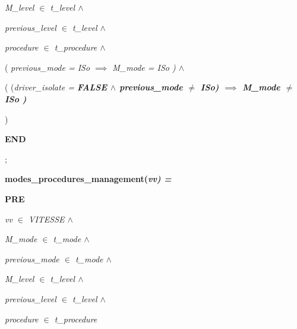 \documentclass[11pt]{article}
\begin{document}
\begin{sloppypar}
\hspace*{0.60in}\it M\_level  $\in$  \it t\_level  $\land$ 

\hspace*{0.60in}\it previous\_level  $\in$  \it t\_level  $\land$ 

\hspace*{0.60in}\it procedure  $\in$  \it t\_procedure  $\land$ 

\hspace*{0.60in}\rm ( \it previous\_mode \rm = \it ISo  $\implies$  \it M\_mode \rm = \it ISo \rm )\hspace*{0.15in} $\land$ 

\hspace*{0.60in}\hspace*{0.60in}\hspace*{0.60in}\rm ( \rm (\it driver\_isolate \rm = \bf FALSE  $\land$  \it previous\_mode  $\not =$  \it ISo\rm )  $\implies$ \hspace*{0.10in}\it M\_mode  $\not =$  \it ISo \rm )

\hspace*{0.60in}\rm )

\hspace*{0.20in}\bf END

\hspace*{0.20in}\rm ; 

\hspace*{0.20in}

\hspace*{0.20in}\bf modes\_procedures\_management\rm (\it vv\rm ) \rm =

\hspace*{0.20in}\bf PRE

\hspace*{0.40in}\it vv  $\in$  \it VITESSE  $\land$ 

\hspace*{0.40in}\it M\_mode  $\in$  \it t\_mode  $\land$ 

\hspace*{0.40in}\it previous\_mode  $\in$  \it t\_mode  $\land$ 

\hspace*{0.40in}\it M\_level  $\in$  \it t\_level  $\land$ 

\hspace*{0.40in}\it previous\_level  $\in$  \it t\_level  $\land$ 

\hspace*{0.40in}\it procedure  $\in$  \it t\_procedure\hspace*{0.40in}


\end{sloppypar}
\end{document}

